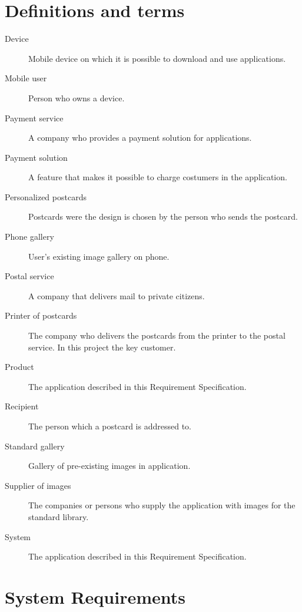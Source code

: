 \documentclass[10pt,a4paper]{article}
\begin{document}

\section{Definitions and terms}
\begin{description}
\item[Device] Mobile device on which it is possible to download and use applications.
\item[Mobile user] Person who owns a device. 
\item[Payment service] A company who provides a payment solution for applications. 
\item[Payment solution] A feature that makes it possible to charge costumers in the application. 

\item[Personalized postcards] Postcards were the design is chosen by the person who sends the postcard. 
\item[Phone gallery] User's existing image gallery on phone.
\item[Postal service] A company that delivers mail to private citizens.
\item[Printer of postcards] The company who delivers the postcards from the printer to the postal service. In this project the key customer.
\item[Product]The application described in this Requirement Specification.
\item[Recipient]The person which a postcard is addressed to.
\item[Standard gallery] Gallery of pre-existing images in application.
\item[Supplier of images] The companies or persons who supply the application with images for the standard library.
\item[System] The application described in this Requirement Specification.
\end{description}

\section{System Requirements}
\end{document}
